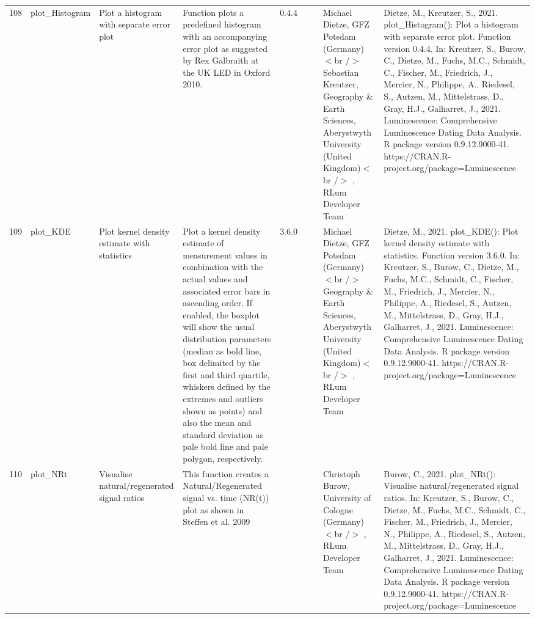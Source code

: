 \begin{table}[ht]
\begin{tabular}{rllllllll}
 \\ 
  108 & plot\_Histogram & Plot a histogram with separate error plot & Function plots a predefined histogram with an accompanying error plot as suggested by Rex Galbraith at the UK LED in Oxford 2010. & 0.4.4
 &  &  & Michael Dietze, GFZ Potsdam (Germany) $<$br /$>$ Sebastian Kreutzer, Geography \& Earth Sciences, Aberystwyth University (United Kingdom)$<$br /$>$ , RLum Developer Team & Dietze, M., Kreutzer, S., 2021. plot\_Histogram(): Plot a histogram with separate error plot. Function version 0.4.4. In: Kreutzer, S., Burow, C., Dietze, M., Fuchs, M.C., Schmidt, C., Fischer, M., Friedrich, J., Mercier, N., Philippe, A., Riedesel, S., Autzen, M., Mittelstrass, D., Gray, H.J., Galharret, J., 2021. Luminescence: Comprehensive Luminescence Dating Data Analysis. R package version 0.9.12.9000-41. https://CRAN.R-project.org/package=Luminescence
 \\ 
  109 & plot\_KDE & Plot kernel density estimate with statistics & Plot a kernel density estimate of measurement values in combination with the actual values and associated error bars in ascending order. If enabled, the boxplot will show the usual distribution parameters (median as bold line, box delimited by the first and third quartile, whiskers defined by the extremes and outliers shown as points) and also the mean and standard deviation as pale bold line and pale polygon, respectively. & 3.6.0
 &  &  & Michael Dietze, GFZ Potsdam (Germany) $<$br /$>$ Geography \& Earth Sciences, Aberystwyth University (United Kingdom)$<$br /$>$ , RLum Developer Team & Dietze, M., 2021. plot\_KDE(): Plot kernel density estimate with statistics. Function version 3.6.0. In: Kreutzer, S., Burow, C., Dietze, M., Fuchs, M.C., Schmidt, C., Fischer, M., Friedrich, J., Mercier, N., Philippe, A., Riedesel, S., Autzen, M., Mittelstrass, D., Gray, H.J., Galharret, J., 2021. Luminescence: Comprehensive Luminescence Dating Data Analysis. R package version 0.9.12.9000-41. https://CRAN.R-project.org/package=Luminescence
 \\ 
  110 & plot\_NRt & Visualise natural/regenerated signal ratios & This function creates a Natural/Regenerated signal vs. time (NR(t)) plot as shown in Steffen et al. 2009 &  &  &  & Christoph Burow, University of Cologne (Germany)$<$br /$>$ , RLum Developer Team & Burow, C., 2021. plot\_NRt(): Visualise natural/regenerated signal ratios. In: Kreutzer, S., Burow, C., Dietze, M., Fuchs, M.C., Schmidt, C., Fischer, M., Friedrich, J., Mercier, N., Philippe, A., Riedesel, S., Autzen, M., Mittelstrass, D., Gray, H.J., Galharret, J., 2021. Luminescence: Comprehensive Luminescence Dating Data Analysis. R package version 0.9.12.9000-41. https://CRAN.R-project.org/package=Luminescence

\end{tabular}
\end{table}
